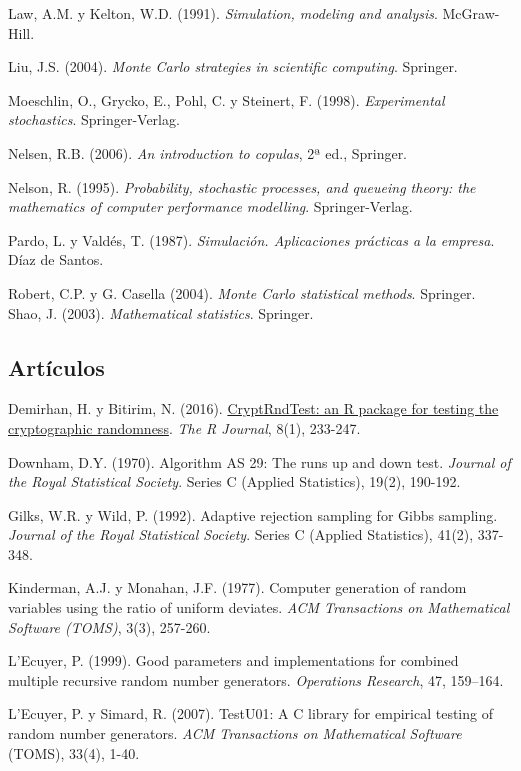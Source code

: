 \documentclass[
]{book}
\theoremstyle{break}
\theoremstyle{nonumberplain}
\begin{document}
Law, A.M. y Kelton, W.D. (1991). \emph{Simulation, modeling and analysis}. McGraw-Hill.

Liu, J.S. (2004). \emph{Monte Carlo strategies in scientific computing}. Springer.

Moeschlin, O., Grycko, E., Pohl, C. y Steinert, F. (1998). \emph{Experimental stochastics}. Springer-Verlag.

Nelsen, R.B. (2006). \emph{An introduction to copulas}, 2ª ed., Springer.

Nelson, R. (1995). \emph{Probability, stochastic processes, and queueing theory: the mathematics of computer performance modelling}. Springer-Verlag.

Pardo, L. y Valdés, T. (1987). \emph{Simulación. Aplicaciones prácticas a la empresa}. Díaz de Santos.

Robert, C.P. y G. Casella (2004). \emph{Monte Carlo statistical methods}. Springer.
Shao, J. (2003). \emph{Mathematical statistics}. Springer.

\hypertarget{artuxedculos}{%
\subsection*{Artículos}\label{artuxedculos}}

Demirhan, H. y Bitirim, N. (2016). \href{https://journal.r-project.org/archive/2016/RJ-2016-016/index.html}{CryptRndTest: an R package for testing the cryptographic randomness}. \emph{The R Journal}, 8(1), 233-247.

Downham, D.Y. (1970). Algorithm AS 29: The runs up and down test. \emph{Journal of the Royal Statistical Society}. Series C (Applied Statistics), 19(2), 190-192.

Gilks, W.R. y Wild, P. (1992). Adaptive rejection sampling for Gibbs sampling. \emph{Journal of the Royal Statistical Society}. Series C (Applied Statistics), 41(2), 337-348.

Kinderman, A.J. y Monahan, J.F. (1977). Computer generation of random variables using the ratio of uniform deviates. \emph{ACM Transactions on Mathematical Software (TOMS)}, 3(3), 257-260.

L'Ecuyer, P. (1999). Good parameters and implementations for combined multiple recursive random number generators. \emph{Operations Research}, 47, 159--164.

L'Ecuyer, P. y Simard, R. (2007). TestU01: A C library for empirical testing of random number generators. \emph{ACM Transactions on Mathematical Software} (TOMS), 33(4), 1-40.
\end{document}
